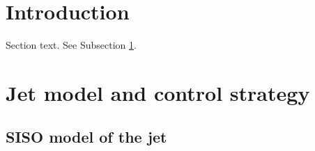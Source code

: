 \documentclass[preprint,12pt]{elsarticle}
\begin{document}












\section{Introduction}
\label{sec1} 

Section text. See Subsection \ref{sec1}.





























\section{Jet model and control strategy}
\label{sec2} 
\subsection{SISO model of the jet}
\label{subsec11}
\end{document}
